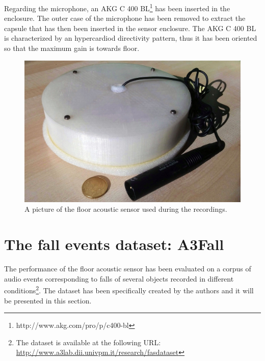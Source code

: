 Regarding the microphone, an AKG C 400 BL\footnote{http://www.akg.com/pro/p/c400-bl} has been inserted in the enclosure. The outer case of the microphone has been removed to extract the capsule that has then been inserted in the sensor enclosure. The AKG C 400 BL is characterized by an hypercardiod directivity pattern, thus it has been oriented so that the maximum gain is towards floor.

\begin{figure}[t]
	\centering
	\includegraphics[width=0.8\columnwidth]{img/FAS_front_little.jpg}
	\caption{A picture of the floor acoustic sensor used during the recordings.} \label{fig:meringa}
\end{figure}

\section{The fall events dataset: A3Fall}
\label{sec:dataset}
The performance of the floor acoustic sensor has been evaluated on a corpus of audio events corresponding to falls of several objects recorded in different conditions\footnote{The dataset is available at the following URL: \url{http://www.a3lab.dii.univpm.it/research/fasdataset}}. The dataset has been specifically created by the authors and it will be presented in this section.

